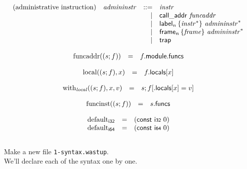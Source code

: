 \documentclass{article}
\newcommand\K[1]{\texttt{#1}}
\begin{document}
\vspace{1ex}

$$
\begin{array}{@{}lrrl@{}l@{}}
	\mbox{(administrative instruction)} & {\mathit{admininstr}} &::=& {\mathit{instr}} \\ &&|&
	\mathsf{call\_addr}~{\mathit{funcaddr}} \\ &&|&
	{\mathsf{label}}_{n}\,\{ {{\mathit{instr}}^\ast} \}~{{\mathit{admininstr}}^\ast} \\ &&|&
	{\mathsf{frame}}_{n}\,\{ {\mathit{frame}} \}~{{\mathit{admininstr}}^\ast} \\ &&|&
	\mathsf{trap} \\
\end{array}
$$

$$
\begin{array}{@{}lcl@{}l@{}}
	{\mathrm{funcaddr}}((s ; f)) &=& f{.}\mathsf{module}{.}\mathsf{funcs} \\
\end{array}
$$

\vspace{1ex}

$$
\begin{array}{@{}lcl@{}l@{}}
	{\mathrm{local}}((s ; f), x) &=& f{.}\mathsf{locals}{}[x] \\
\end{array}
$$

$$
\begin{array}{@{}lcl@{}l@{}}
	{\mathrm{with}}_{\mathit{local}}((s ; f), x, v) &=& s ; f{}[{.}\mathsf{locals}{}[x] = v] \\
\end{array}
$$

$$
\begin{array}{@{}lcl@{}l@{}}
	{\mathrm{funcinst}}((s ; f)) &=& s{.}\mathsf{funcs} \\
\end{array}
$$

$$
\begin{array}{@{}lcl@{}l@{}}
	{{\mathrm{default}}}_{\mathsf{i{\scriptstyle 32}}} &=& (\mathsf{const}~\mathsf{i{\scriptstyle 32}}~0) \\
	{{\mathrm{default}}}_{\mathsf{i{\scriptstyle 64}}} &=& (\mathsf{const}~\mathsf{i{\scriptstyle 64}}~0) \\
\end{array}
$$
\\
Make a new file \K{1-syntax.wastup}. \\
We'll declare each of the syntax one by one.
\end{document}
